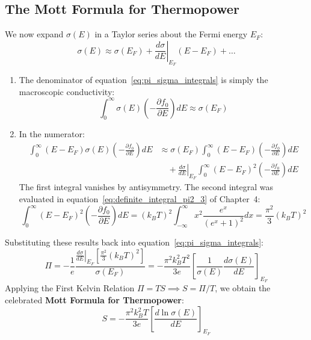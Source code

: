 \documentclass[11pt,a4paper]{article}
\begin{document}
\subsection{The Mott Formula for Thermopower}
We now expand $\sigma(E)$ in a Taylor series about the Fermi energy $E_F$:
\begin{equation}
\sigma(E) \approx \sigma(E_F) + \left.\frac{d\sigma}{dE}\right|_{E_F}(E - E_F) + \dots
\end{equation}
\begin{enumerate}
    \item The denominator of equation~\eqref{eq:pi_sigma_integrals} is simply the macroscopic conductivity:
    \begin{equation}
    \int_0^\infty \sigma(E)\left(-\frac{\partial f_0}{\partial E}\right)dE \approx \sigma(E_F)
    \end{equation}
    \item In the numerator:
    \begin{align}
    \int_0^\infty (E - E_F)\sigma(E)\left(-\frac{\partial f_0}{\partial E}\right)dE &\approx \sigma(E_F)\int_0^\infty (E - E_F)\left(-\frac{\partial f_0}{\partial E}\right)dE \nonumber \\
    &\quad + \left.\frac{d\sigma}{dE}\right|_{E_F} \int_0^\infty (E - E_F)^2 \left(-\frac{\partial f_0}{\partial E}\right)dE
    \end{align}
    The first integral vanishes by antisymmetry. 
    The second integral was evaluated in equation~\eqref{eq:definite_integral_pi2_3} of Chapter~4:
    \begin{equation}
    \int_0^\infty (E - E_F)^2 \left(-\frac{\partial f_0}{\partial E}\right)dE = (k_B T)^2 \int_{-\infty}^\infty x^2 \frac{e^x}{(e^x+1)^2}dx = \frac{\pi^2}{3}(k_B T)^2
    \end{equation}
\end{enumerate}
Substituting these results back into equation~\eqref{eq:pi_sigma_integrals}:
\begin{equation}
\Pi = -\frac{1}{e}\frac{\left.\frac{d\sigma}{dE}\right|_{E_F} \left[ \frac{\pi^2}{3}(k_B T)^2 \right]}{\sigma(E_F)} = -\frac{\pi^2 k_B^2 T^2}{3e}\left[ \frac{1}{\sigma(E)}\frac{d\sigma(E)}{dE} \right]_{E_F}
\label{eq:peltier_mott}
\end{equation}
Applying the First Kelvin Relation $\Pi = TS \implies S = \Pi/T$, we obtain the celebrated \textbf{Mott Formula for Thermopower}:
\begin{equation}
\boxed{S = -\frac{\pi^2 k_B^2 T}{3e}\left[ \frac{d\ln\sigma(E)}{dE} \right]_{E_F}}
\label{eq:mott_formula}
\end{equation}
\end{document}
